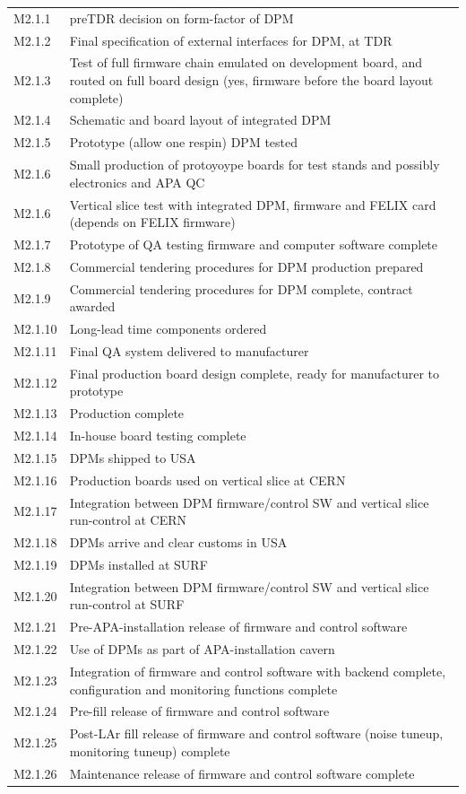 \begin{tabular}{lp{12cm}}
M2.1.1  & preTDR decision on form-factor of DPM \\
M2.1.2  & Final specification of external interfaces for DPM, at TDR\\
M2.1.3  & Test of full firmware chain emulated on development board, and routed on
          full board design (yes, firmware before the board layout complete)\\
M2.1.4  & Schematic and board layout of integrated DPM\\
M2.1.5  & Prototype (allow one respin) DPM tested\\
M2.1.6  & Small production of protoyoype boards for test stands and possibly electronics and APA QC\\
M2.1.6  & Vertical slice test with integrated DPM, firmware and FELIX card (depends on FELIX firmware)\\
M2.1.7  & Prototype of QA testing firmware and computer software complete\\
M2.1.8  & Commercial tendering procedures for DPM production prepared\\
M2.1.9  & Commercial tendering procedures for DPM complete, contract awarded\\
M2.1.10 & Long-lead time components ordered\\
M2.1.11 & Final QA system delivered to manufacturer\\
M2.1.12 & Final production board design complete, ready for manufacturer to prototype\\
M2.1.13 & Production complete\\
M2.1.14 & In-house board testing complete\\
M2.1.15 & DPMs shipped to USA\\
M2.1.16 & Production boards used on vertical slice at CERN\\
M2.1.17 & Integration between DPM firmware/control SW and vertical slice run-control at CERN\\
M2.1.18 & DPMs arrive and clear customs in USA\\
M2.1.19 & DPMs installed at SURF\\
M2.1.20 & Integration between DPM firmware/control SW and vertical slice run-control at SURF\\
M2.1.21 & Pre-APA-installation release of firmware and control software\\
M2.1.22 & Use of DPMs as part of APA-installation cavern\\
M2.1.23 & Integration of firmware and control software with backend complete, configuration and monitoring functions complete\\
M2.1.24 & Pre-fill release of firmware and control software\\
M2.1.25 & Post-LAr fill release of firmware and control software (noise tuneup, monitoring tuneup) complete\\
M2.1.26 & Maintenance release of firmware and control software complete\\
\end{tabular}


